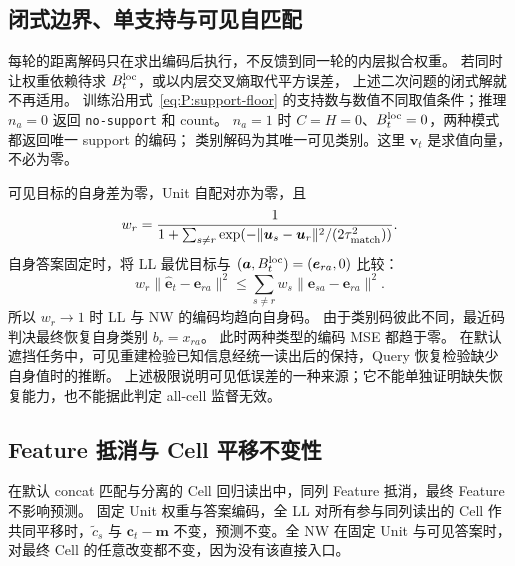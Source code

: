 \documentclass[11pt,UTF8,fontset=fandol]{ctexart}
\numberwithin{equation}{section}
\theoremstyle{definition}
\begin{document}
\subsection{闭式边界、单支持与可见自匹配}
每轮的距离解码只在求出编码后执行，不反馈到同一轮的内层拟合权重。
若同时让权重依赖待求 $B_t^{\rm loc}$，或以内层交叉熵取代平方误差，
上述二次问题的闭式解就不再适用。
训练沿用式~\eqref{eq:P:support-floor} 的支持数与数值不同取值条件；推理 $n_a=0$ 返回 \texttt{no-support} 和 count。
$n_a=1$ 时 $C=H=0$、$B_t^{\rm loc}=0$，两种模式都返回唯一 support 的编码；
类别解码为其唯一可见类别。这里 $\bm v_t$ 是求值向量，不必为零。

可见目标的自身差为零，Unit 自配对亦为零，且
\begin{equation}
 w_r=\frac1{1+\sum_{s\ne r}\exp(-\|\bm u_s-\bm u_r\|^2/(2\tau_{\rm match}^2))}.
 \label{eq:R:self-weight}
\end{equation}
自身答案固定时，将 LL 最优目标与 $(\bm a,B_t^{\rm loc})=(\bm e_{ra},0)$ 比较：
\[
 w_r\|\widehat{\bm e}_t-\bm e_{ra}\|^2
 \le\sum_{s\ne r}w_s\|\bm e_{sa}-\bm e_{ra}\|^2.
\]
所以 $w_r\to1$ 时 LL 与 NW 的编码均趋向自身码。
由于类别码彼此不同，最近码判决最终恢复自身类别 $b_r=x_{ra}$。
此时两种类型的编码 MSE 都趋于零。
在默认遮挡任务中，可见重建检验已知信息经统一读出后的保持，Query 恢复检验缺少自身值时的推断。
上述极限说明可见低误差的一种来源；它不能单独证明缺失恢复能力，也不能据此判定 all-cell 监督无效。

\subsection{Feature 抵消与 Cell 平移不变性}
在默认 concat 匹配与分离的 Cell 回归读出中，同列 Feature 抵消，最终 Feature 不影响预测。
固定 Unit 权重与答案编码，全 LL 对所有参与同列读出的 Cell 作共同平移时，$\widetilde c_s$ 与
$\bm c_t-\bm m$ 不变，预测不变。全 NW 在固定 Unit 与可见答案时，
对最终 Cell 的任意改变都不变，因为没有该直接入口。
\end{document}
